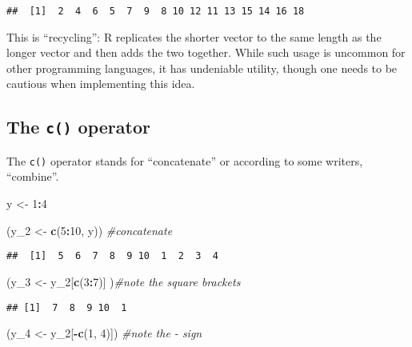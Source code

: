 \documentclass[]{article}
\newenvironment{Shaded}{\begin{snugshade}}{\end{snugshade}}
\newcommand{\KeywordTok}[1]{\textcolor[rgb]{0.13,0.29,0.53}{\textbf{#1}}}
\newcommand{\DecValTok}[1]{\textcolor[rgb]{0.00,0.00,0.81}{#1}}
\newcommand{\StringTok}[1]{\textcolor[rgb]{0.31,0.60,0.02}{#1}}
\newcommand{\CommentTok}[1]{\textcolor[rgb]{0.56,0.35,0.01}{\textit{#1}}}
\newcommand{\OperatorTok}[1]{\textcolor[rgb]{0.81,0.36,0.00}{\textbf{#1}}}
\newcommand{\NormalTok}[1]{#1}
\begin{document}
\begin{verbatim}
##  [1]  2  4  6  5  7  9  8 10 12 11 13 15 14 16 18
\end{verbatim}

This is ``recycling'': R replicates the shorter vector to the same
length as the longer vector and then adds the two together. While such
usage is uncommon for other programming languages, it has undeniable
utility, though one needs to be cautious when implementing this idea.

\subsection{\texorpdfstring{The \texttt{c()}
operator}{The c() operator}}\label{the-c-operator}

The \texttt{c()} operator stands for ``concatenate'' or according to
some writers, ``combine''.

\begin{Shaded}
\begin{Highlighting}[]
\NormalTok{y <-}\StringTok{ }\DecValTok{1}\OperatorTok{:}\DecValTok{4}

\NormalTok{(y_}\DecValTok{2}\NormalTok{ <-}\StringTok{ }\KeywordTok{c}\NormalTok{(}\DecValTok{5}\OperatorTok{:}\DecValTok{10}\NormalTok{, y)) }\CommentTok{#concatenate}
\end{Highlighting}
\end{Shaded}

\begin{verbatim}
##  [1]  5  6  7  8  9 10  1  2  3  4
\end{verbatim}

\begin{Shaded}
\begin{Highlighting}[]
\NormalTok{(y_}\DecValTok{3}\NormalTok{ <-}\StringTok{ }\NormalTok{y_}\DecValTok{2}\NormalTok{[}\KeywordTok{c}\NormalTok{(}\DecValTok{3}\OperatorTok{:}\DecValTok{7}\NormalTok{)] )}\CommentTok{#note the square brackets}
\end{Highlighting}
\end{Shaded}

\begin{verbatim}
## [1]  7  8  9 10  1
\end{verbatim}

\begin{Shaded}
\begin{Highlighting}[]
\NormalTok{(y_}\DecValTok{4}\NormalTok{ <-}\StringTok{ }\NormalTok{y_}\DecValTok{2}\NormalTok{[}\OperatorTok{-}\KeywordTok{c}\NormalTok{(}\DecValTok{1}\NormalTok{, }\DecValTok{4}\NormalTok{)]) }\CommentTok{#note the - sign}
\end{Highlighting}
\end{Shaded}
\end{document}
